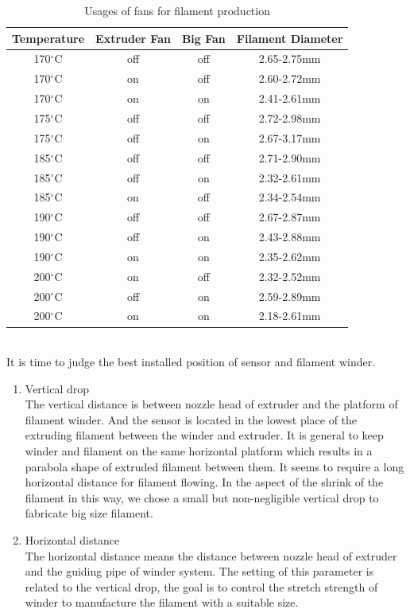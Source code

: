 \begin{table}[t]
\centering
\caption{Usages of fans for filament production}
\begin{tabular}{c c c c}
\hline
\textbf{Temperature} & \textbf{Extruder Fan} & \textbf{Big Fan} & \textbf{Filament Diameter}\\
\hline
170$^{\circ}$C & off & off & 2.65-2.75mm \\
170$^{\circ}$C & on & off & 2.60-2.72mm\\
170$^{\circ}$C & on & on & 2.41-2.61mm  \\
175$^{\circ}$C & off & off & 2.72-2.98mm \\
175$^{\circ}$C & off & on & 2.67-3.17mm\\
185$^{\circ}$C & off & off & 2.71-2.90mm \\
185$^{\circ}$C & off & on & 2.32-2.61mm\\
185$^{\circ}$C & on & off & 2.34-2.54mm  \\
190$^{\circ}$C & off & off & 2.67-2.87mm \\
190$^{\circ}$C & off & on & 2.43-2.88mm \\
190$^{\circ}$C & on & on &  2.35-2.62mm\\
200$^{\circ}$C & on & off & 2.32-2.52mm \\
200$^{\circ}$C & off & on & 2.59-2.89mm \\
200$^{\circ}$C & on & on & 2.18-2.61mm \\
\hline
\end{tabular}
\label{tab:fan}
\end{table}\\
It is time to judge the best installed position of sensor and filament winder.  
\begin{enumerate}
\item Vertical drop\\
The vertical distance is between nozzle head of extruder and the platform of filament winder. And the sensor is located in the lowest place of the extruding filament between the winder and extruder. It is general to keep winder and filament on the same horizontal platform which results in a parabola shape of extruded filament between them. It seems to require a long horizontal distance for filament flowing. In the aspect of the shrink of the filament in this way, we chose a small but non-negligible vertical drop to fabricate big size filament.
\item Horizontal distance\\
The horizontal distance means the distance between nozzle head of extruder and the guiding pipe of winder system. The setting of this parameter is related to the vertical drop, the goal is to control the stretch strength of winder to manufacture the filament with a suitable size.
\end{enumerate}
